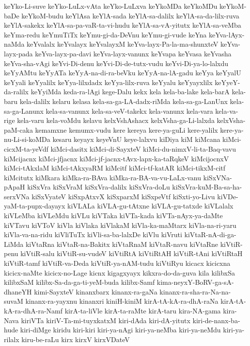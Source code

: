 {keYko-Li-suve
keYko-LuLx-vAta
keYko-LuLxva
keYkoMDa
keYkoMDu
keYkoM-baDe
keYkoM-budu
keYlAsa
keYlA-sada
keYlA-sa-dalilx
keYlA-sa-da-lilx-ruva
keYlA-sakekx
keYlA-sa-pa-vaR-ta-vi-hudu
keYlA-sa-vA-yitutx
keYlA-sa-veMba
keYma-redu
keYmuTiTx
keYmu-gi-da-DeVnu
keYmu-gi-vude
keYna
keYva-lAyx-naMda
keYvalalx
keYvalayx
keYvalayxM
keYva-layx-Pa-la-ma-shunxteV
keYva-layx-pada
keYva-layx-pa-davi
keYva-layx-vanunx
keYvapa
keYvasa
keYvasha
keYva-sha-vAgi
keYvi-Di-denu
keYvi-Di-de-tutx-vudu
keYvi-Di-ya-lo-lalxdu
keYyAMtu
keYyATa
keYyA-na-di-ra-beVku
keYyA-na-lA-gadu
keYya
keYyalU
keYyali
keYyalilx
keYya-lilxdadx
keYya-lilx-ruva
keYyalu
keYyayxlilx
keYyeY-da-ralilx
keYyiMda
keda-ra-lAgi
kege-Dalu
kekx
kela
kela-ba-lake
kela-barA
kela-baru
kela-dalilx
kelaru
kelasa
kela-sa-ga-LA-dadx-riMda
kela-sa-ga-LanUnx
kela-sa-ga-Lanunx
kela-sa-vanunx
kela-sa-veV-takekx
kela-vanunx
kela-vara
kela-va-rige
kela-varu
kela-voMdu
kelavu
kelxVshAshacx
kelxVsha-ga-Li-lalxda
kelxVsha-paM-caka
kemamxne
kemumx-vudu
kere
kereya
kere-ya-guLi
kere-yalilx
kere-ya-nu-Li-si-koMDa
kesaru
keyayx
keyeVnU
keye-lalxvu
kiDiya
kiM
kiMcana
kiMci-cicxM-ta-yeVdf
kiMci-dasitx
kiMci-di-SayxteV
kiMci-du-nimxV-li-ta-Baq-vavu
kiMcijacnx
kiMci-jfjacnx
kiMci-jf-jacnx-tAvx-lapx-ka-taRqkeV
kiMcijocnxV
kiMci-tAkxlaM
kiMci-tAkxyaRM
kiMcitf
kiMci-tf-katAR
kiMci-tikxM-citf
kiMcitutx
kiMkara
kiMka-ra-BAva
kiMka-ra-BA-va-vu-LaLx-vanu
kiSxVNa-pApaH
kiSxVra
kiSxVraM
kiSxVra-dalilx
kiSxVra-doLu
kiSxVra-kuM-Ba-sa-ha-serxVNa
kiSxVyateV
kiSxpAtxvX
kiSxparxM
kiSxpeVtf
kiSxti-yo-Livu
kiVDe-yaM-ta-pupx-dayayx
kiVLALa
kiVLA-gu-tAtxne
kiVLA-gu-tatxde
kiVLalalx
kiVLeMba
kiVLeMdu
kiVLu
kiVTaka
kiVTa-kada
kiVTa-nAyx-ya-daMte
kiVTavu
kiVToV
kiVla
kiVlaka
kiVlakaM
kiVla-ka-maMtarx
kiVla-na-ri-yaru
kiVla-va-na-ridu
kiVliTuTx
kiVli-sa-ba-lalxDe
kiVlu
kiVruti
kiVtaR-nA-di-ga-LiMda
kiVtaRna
kiVtaR-na-Bakitx
kiVtaRnaM
kiVtaR-navu
kiVtaRne
kiVtiR-penu
kiVtiR-salu
kiVtiR-su-vudeV
kiVtiRtA
kiVtiRtAH
kiVtiR-tAni
kiVtiRtaH
kiVtiR-tamf
kiVtiR-va-Deda
kiVtiR-ya-nAM-tudu
kiVtiRyu
kicacx
kicicxna
kicicx-naMte
kicicx-no-Lage
kicnx
kigagxyayx
kikxra-do-da-guva
kila
kilibxSa
kilibxSaM
kilibx-Sa-da-ga-ti-yeM-buda
kilibx-Samf
kima-neyxY-BoRV-ga-sA-dhaneYH
kimi-SayxteV
kinanxbarx
kinanx-ra-gaNa
kinanx-ra-sha-ra-Na-na-suvaM
kinanx-ra-yayxnu
kinanxri
kiniH-kiniM
kirA-tA-kA-ra-dhA-raNa
kirA-tA-kA-ra-dhA-ra-Namf
kirA-ta-liVle
kirA-ta-raMte
kirA-taru
kira-NA-gama
kira-Nava
kiriVTa
kiriV-Ta-mi-tuyxkatxM
kiri-dAda
kiri-dA-yitutx
kiri-de-nanx-ba-hude
kiri-diMge
kiridu
kiri-kiri
kiri-ya-nAgi
kiri-ya-neMba
kiri-ya-neMdu
kiri-ya-rilalx
kiru-be-raLu
kirx
kirxV
kirxVDateV
}
